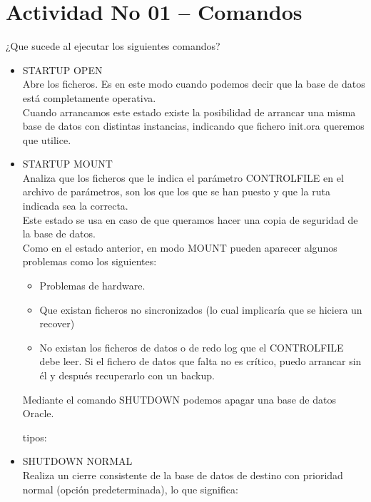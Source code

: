 \section{Actividad No 01 – Comandos} 
¿Que sucede al ejecutar los siguientes comandos? 

\begin{itemize}
	\item STARTUP OPEN
	\\Abre los ficheros. Es en este modo cuando podemos decir que la base de datos está
		completamente operativa.
	\\Cuando arrancamos este estado existe la posibilidad de arrancar una misma base de datos
    con distintas instancias, indicando que fichero init.ora queremos que utilice.
	

	\item STARTUP MOUNT
	\\Analiza que los ficheros que le indica el parámetro CONTROLFILE en el archivo de
		parámetros, son los que los que se han puesto y que la ruta indicada sea la correcta.
	\\Este estado se usa en caso de que queramos hacer una copia de seguridad de la base de
		datos.
	\\Como en el estado anterior, en modo MOUNT pueden aparecer algunos problemas como los
		siguientes:
		
		\begin{itemize}
			\item Problemas de hardware.
			\item Que existan ficheros no sincronizados (lo cual implicaría que se hiciera un 	recover)
			\item No existan los ficheros de datos o de redo log que el CONTROLFILE debe leer. 
			Si el fichero de datos que falta no es crítico, puedo arrancar sin él y después recuperarlo 
			con un backup.
			
		\end{itemize}

\vspace*{0.20in}
\vspace*{0.1in}
\begin{large}
Mediante el comando SHUTDOWN podemos apagar una base de datos Oracle. \\
\end{large}

tipos:

\item SHUTDOWN NORMAL
	\\Realiza un cierre consistente de la base de datos de destino con prioridad normal (opción predeterminada), lo que significa:
		

\end{itemize}
